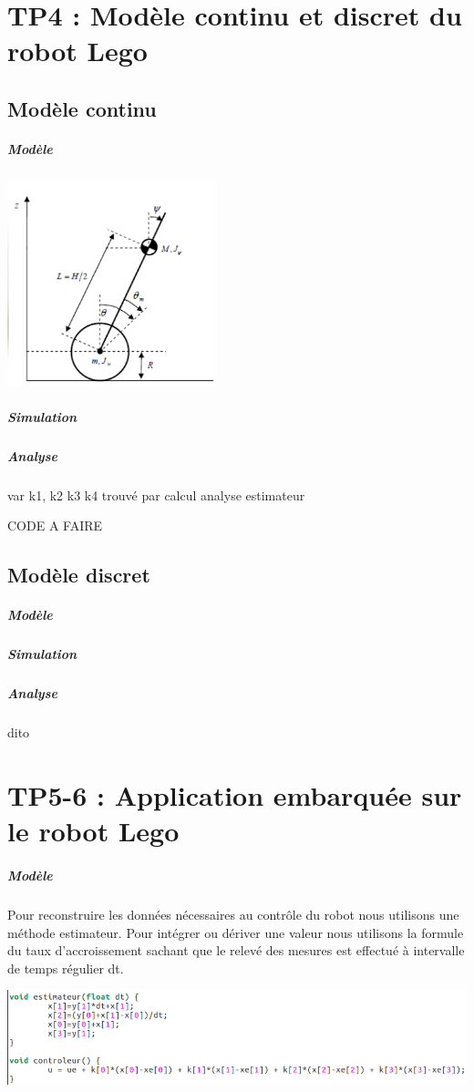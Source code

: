 \documentclass[a4paper,12pt]{article}
\begin{document}
\clearpage
\section{TP4 : Modèle continu et discret du robot Lego}
\subsection{Modèle continu}
\subparagraph{Modèle}

\begin{center}
\includegraphics[height=6cm]{./img/robot.png}
\end{center}

\subparagraph{Simulation}
\subparagraph{Analyse}

var k1, k2 k3 k4 trouvé par calcul
analyse estimateur

CODE A FAIRE

\subsection{Modèle discret}
\subparagraph{Modèle}
\subparagraph{Simulation}
\subparagraph{Analyse}

dito


\clearpage
\section{TP5-6 : Application embarquée sur le robot Lego}
\subparagraph{Modèle}

Pour reconstruire les données nécessaires au contrôle du robot nous utilisons une méthode estimateur. Pour intégrer ou dériver une valeur nous utilisons la formule du taux d'accroissement sachant que le relevé des mesures est effectué à intervalle de temps régulier dt.

\begin{center}
\includegraphics[width=17cm]{./img/tp5_c.png}
\end{center}
\end{document}
